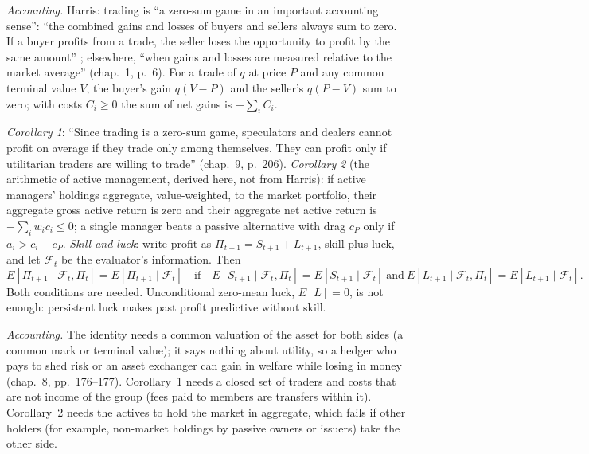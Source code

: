 \begin{qfresult}\label{res:zero-sum-skill-luck}
 \emph{Accounting.} Harris: trading is ``a zero-sum game in an important accounting sense'': ``the combined gains and losses of buyers and sellers always sum to zero. If a buyer profits from a trade, the seller loses the opportunity to profit by the same amount'' \citep[chap.~8, p.~176]{alpha-harris}; elsewhere, ``when gains and losses are measured relative to the market average'' (chap.~1, p.~6). For a trade of $q$ at price $P$ and any common terminal value $V$, the buyer's gain $q(V-P)$ and the seller's $q(P-V)$ sum to zero; with costs $C_i\ge0$ the sum of net gains is $-\sum_iC_i$.

\emph{Corollary 1}: ``Since trading is a zero-sum game, speculators and dealers cannot profit on average if they trade only among themselves. They can profit only if utilitarian traders are willing to trade'' (chap.~9, p.~206). \emph{Corollary 2} (the arithmetic of active management, derived here, not from Harris): if active managers' holdings aggregate, value-weighted, to the market portfolio, their aggregate gross active return is zero and their aggregate net active return is $-\sum_iw_ic_i\le0$; a single manager beats a passive alternative with drag $c_P$ only if $a_i>c_i-c_P$. \emph{Skill and luck}: write profit as $\Pi_{t+1}=S_{t+1}+L_{t+1}$, skill plus luck, and let $\mathcal F_t$ be the evaluator's information. Then
\[ E[\Pi_{t+1}\mid\mathcal F_t,\Pi_t]=E[\Pi_{t+1}\mid\mathcal F_t]\quad\text{if}\quad E[S_{t+1}\mid\mathcal F_t,\Pi_t]=E[S_{t+1}\mid\mathcal F_t]\ \text{and}\ E[L_{t+1}\mid\mathcal F_t,\Pi_t]=E[L_{t+1}\mid\mathcal F_t]. \]
Both conditions are needed. Unconditional zero-mean luck, $E[L]=0$, is not enough: persistent luck makes past profit predictive without skill.

 \emph{Accounting.} The identity needs a common valuation of the asset for both sides (a common mark or terminal value); it says nothing about utility, so a hedger who pays to shed risk or an asset exchanger can gain in welfare while losing in money (chap.~8, pp.~176--177). Corollary~1 needs a closed set of traders and costs that are not income of the group (fees paid to members are transfers within it). Corollary~2 needs the actives to hold the market in aggregate, which fails if other holders (for example, non-market holdings by passive owners or issuers) take the other side.


\end{qfresult}
